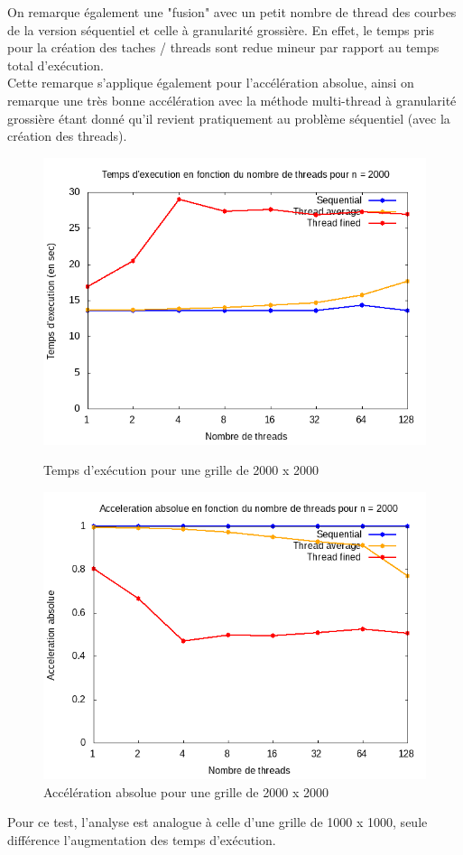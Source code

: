 \documentclass[10pt,a4paper]{article}
\begin{document}
On remarque également une "fusion" avec un petit nombre de thread des courbes de la version séquentiel et celle à granularité grossière. En effet, le temps pris pour la création des taches / threads sont redue mineur par rapport au temps total d'exécution. \\
Cette remarque s'applique également pour l'accélération absolue, ainsi on remarque une très bonne accélération avec la méthode multi-thread à granularité grossière étant donné qu'il revient pratiquement au problème séquentiel (avec la création des threads).


\begin{figure}[h]
  \centering
  \begin{minipage}[b]{0.49\textwidth}
	\includegraphics[width=\textwidth]{./Time/size_2000_time.png}
    \caption{Temps d'exécution pour une grille de 2000 x 2000}
  \end{minipage}
  \hfill
  \begin{minipage}[b]{0.49\textwidth}
    \includegraphics[width=\textwidth]{./Time/size_2000_acceleration.png}
    \caption{Accélération absolue pour une grille de 2000 x 2000}
  \end{minipage}
\end{figure}
\newpage
Pour ce test, l'analyse est analogue à celle d'une grille de 1000 x 1000,
seule différence l'augmentation des temps d'exécution.
\end{document}
